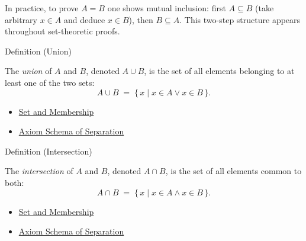 \begin{remark*}
In practice, to prove $A = B$ one shows mutual inclusion: first $A \subseteq B$
(take arbitrary $x \in A$ and deduce $x \in B$), then $B \subseteq A$.
This two-step structure appears throughout set-theoretic proofs.
\end{remark*}

\begin{definitionbox}{Definition (Union)}
\begin{definition}[Union]\label{def:union}
The \emph{union} of $A$ and $B$, denoted $A \cup B$, is the set of all
elements belonging to at least one of the two sets:
\[
A \cup B \;=\; \{\, x \mid x \in A \lor x \in B \,\}.
\]
\end{definition}
\end{definitionbox}

\begin{dependencies}
\begin{itemize}
  \item \hyperref[def:set-membership]{Set and Membership}
  \item \hyperref[ax:separation]{Axiom Schema of Separation}
\end{itemize}
\end{dependencies}



\begin{definitionbox}{Definition (Intersection)}
\begin{definition}[Intersection]\label{def:intersection}
The \emph{intersection} of $A$ and $B$, denoted $A \cap B$, is the set of all
elements common to both:
\[
A \cap B \;=\; \{\, x \mid x \in A \land x \in B \,\}.
\]
\end{definition}
\end{definitionbox}

\begin{dependencies}
\begin{itemize}
  \item \hyperref[def:set-membership]{Set and Membership}
  \item \hyperref[ax:separation]{Axiom Schema of Separation}
\end{itemize}
\end{dependencies}



